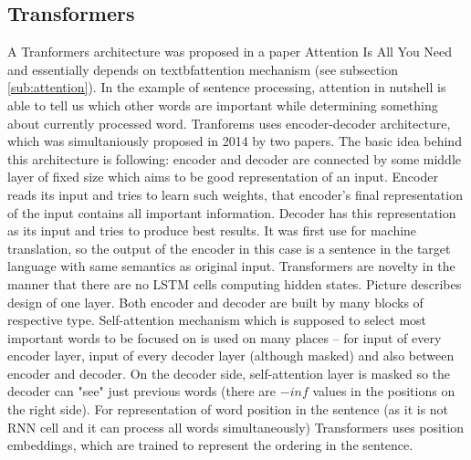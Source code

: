 \subsection{Transformers}
A Tranformers architecture was proposed in a paper Attention Is All You Need %
and essentially depends on textbf{attention} mechanism (see subsection \ref{sub:attention}). In the example of sentence processing, attention in nutshell is able to tell us which other words are important while determining something about currently processed word.
Tranforems uses encoder-decoder architecture, which was simultaniously proposed in 2014 by two papers. The basic idea behind this architecture is following: encoder and decoder are connected by some middle layer of fixed size which aims to be good representation of an input. Encoder reads its input and tries to learn such weights, that encoder's final representation of the input contains all important information. Decoder has this representation as its input and tries to produce best results. It was first use for machine translation, so the output of the encoder in this case is a sentence in the target language with same semantics as original input. %
Transformers are novelty in the manner that there are no LSTM cells computing hidden states.%
Picture %
describes design of one layer. Both encoder and decoder are built by many blocks of respective type. Self-attention mechanism which is supposed to select most important words to be focused on is used on many places -- for input of  every encoder layer, input of every decoder layer (although masked) and also between encoder and decoder. On the decoder side, self-attention layer is masked so the decoder can "see" just previous words (there are $-inf$ values in the positions on the right side). For representation of word position in the sentence (as it is not RNN cell and it can process all words simultaneously) Transformers uses position embeddings, which are trained to represent the ordering in the sentence.



